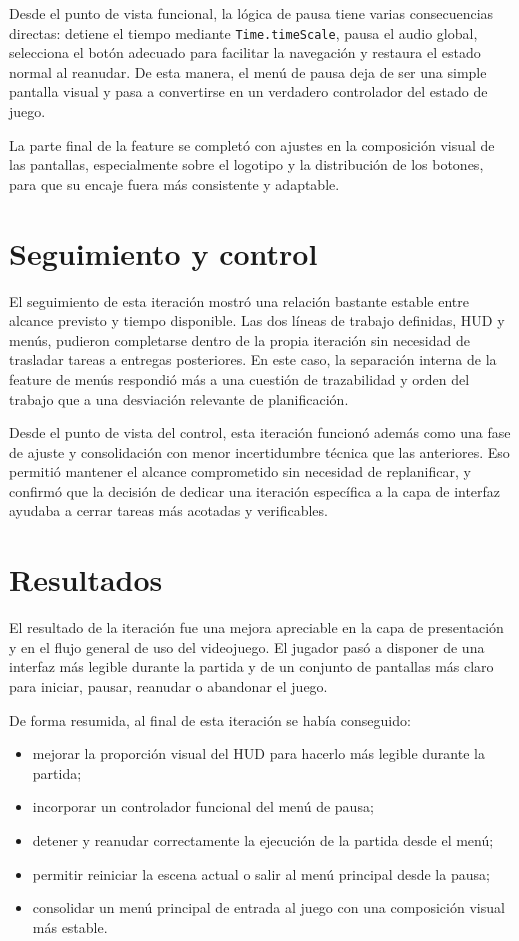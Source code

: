 Desde el punto de vista funcional, la lógica de pausa tiene varias consecuencias directas:
detiene el tiempo mediante \texttt{Time.timeScale}, pausa el audio global, selecciona el
botón adecuado para facilitar la navegación y restaura el estado normal al reanudar. De
esta manera, el menú de pausa deja de ser una simple pantalla visual y pasa a convertirse en
un verdadero controlador del estado de juego.

La parte final de la feature se completó con ajustes en la composición visual de las
pantallas, especialmente sobre el logotipo y la distribución de los botones, para que su
encaje fuera más consistente y adaptable.

\section{Seguimiento y control}
El seguimiento de esta iteración mostró una relación bastante estable entre alcance previsto y
tiempo disponible. Las dos líneas de trabajo definidas, HUD y menús, pudieron completarse dentro
de la propia iteración sin necesidad de trasladar tareas a entregas posteriores. En este caso,
la separación interna de la feature de menús respondió más a una cuestión de trazabilidad y
orden del trabajo que a una desviación relevante de planificación.

Desde el punto de vista del control, esta iteración funcionó además como una fase de ajuste y
consolidación con menor incertidumbre técnica que las anteriores. Eso permitió mantener el
alcance comprometido sin necesidad de replanificar, y confirmó que la decisión de dedicar una
iteración específica a la capa de interfaz ayudaba a cerrar tareas más acotadas y verificables.

\section{Resultados}
El resultado de la iteración fue una mejora apreciable en la capa de presentación y en el
flujo general de uso del videojuego. El jugador pasó a disponer de una interfaz más
legible durante la partida y de un conjunto de pantallas más claro para iniciar, pausar,
reanudar o abandonar el juego.

De forma resumida, al final de esta iteración se había conseguido:

\begin{itemize}
    \item mejorar la proporción visual del HUD para hacerlo más legible durante la partida;
    \item incorporar un controlador funcional del menú de pausa;
    \item detener y reanudar correctamente la ejecución de la partida desde el menú;
    \item permitir reiniciar la escena actual o salir al menú principal desde la pausa;
    \item consolidar un menú principal de entrada al juego con una composición visual más estable.
\end{itemize}

